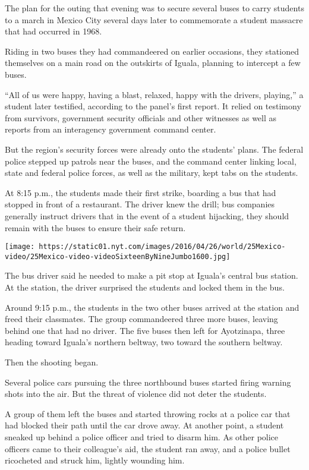The plan for the outing that evening was to secure several buses to
carry students to a march in Mexico City several days later to
commemorate a student massacre that had occurred in 1968.

Riding in two buses they had commandeered on earlier occasions, they
stationed themselves on a main road on the outskirts of Iguala, planning
to intercept a few buses.

``All of us were happy, having a blast, relaxed, happy with the drivers,
playing,'' a student later testified, according to the panel's first
report. It relied on testimony from survivors, government security
officials and other witnesses as well as reports from an interagency
government command center.

But the region's security forces were already onto the students' plans.
The federal police stepped up patrols near the buses, and the command
center linking local, state and federal police forces, as well as the
military, kept tabs on the students.

At 8:15 p.m., the students made their first strike, boarding a bus that
had stopped in front of a restaurant. The driver knew the drill; bus
companies generally instruct drivers that in the event of a student
hijacking, they should remain with the buses to ensure their safe
return.

\texttt{[image: https://static01.nyt.com/images/2016/04/26/world/25Mexico-video/25Mexico-video-videoSixteenByNineJumbo1600.jpg]}

The bus driver said he needed to make a pit stop at Iguala's central bus
station. At the station, the driver surprised the students and locked
them in the bus.

Around 9:15 p.m., the students in the two other buses arrived at the
station and freed their classmates. The group commandeered three more
buses, leaving behind one that had no driver. The five buses then left
for Ayotzinapa, three heading toward Iguala's northern beltway, two
toward the southern beltway.

Then the shooting began.

Several police cars pursuing the three northbound buses started firing
warning shots into the air. But the threat of violence did not deter the
students.

A group of them left the buses and started throwing rocks at a police
car that had blocked their path until the car drove away. At another
point, a student sneaked up behind a police officer and tried to disarm
him. As other police officers came to their colleague's aid, the student
ran away, and a police bullet ricocheted and struck him, lightly
wounding him.

